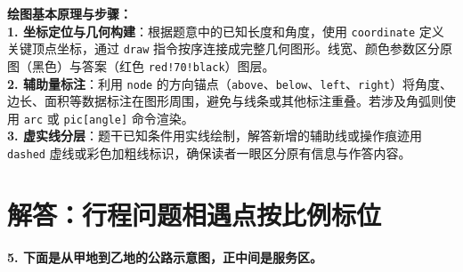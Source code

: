 {\small\color{blue!70!black}
\textbf{绘图基本原理与步骤：}\\
\textbf{1. 坐标定位与几何构建}：根据题意中的已知长度和角度，使用 \texttt{coordinate} 定义关键顶点坐标，通过 \texttt{draw} 指令按序连接成完整几何图形。线宽、颜色参数区分原图（黑色）与答案（红色 \texttt{red!70!black}）图层。\\
\textbf{2. 辅助量标注}：利用 \texttt{node} 的方向锚点（\texttt{above}、\texttt{below}、\texttt{left}、\texttt{right}）将角度、边长、面积等数据标注在图形周围，避免与线条或其他标注重叠。若涉及角弧则使用 \texttt{arc} 或 \texttt{pic[angle]} 命令渲染。\\
\textbf{3. 虚实线分层}：题干已知条件用实线绘制，解答新增的辅助线或操作痕迹用 \texttt{dashed} 虚线或彩色加粗线标识，确保读者一眼区分原有信息与作答内容。
}


\newpage



\newpage

\section{解答：行程问题相遇点按比例标位}

\vspace{0.4cm}

\noindent\textbf{5. 下面是从甲地到乙地的公路示意图，正中间是服务区。}

\vspace{0.4cm}
\begin{center}
\end{center}
\vspace{0.4cm}

